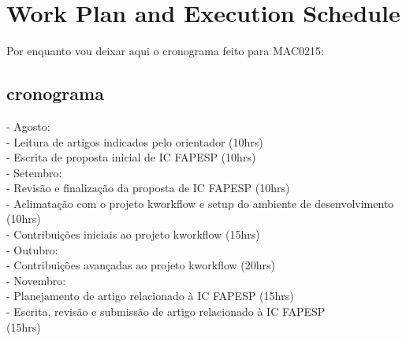 \section{Work Plan and Execution Schedule}
\label{chp:workplan-schedule}

Por enquanto vou deixar aqui o cronograma feito para MAC0215:
\subsection{cronograma}

- Agosto:\\
    - Leitura de artigos indicados pelo orientador (10hrs)\\
    - Escrita de proposta inicial de IC FAPESP (10hrs)\\
- Setembro:\\
    - Revisão e finalização da proposta de IC FAPESP (10hrs)\\
    - Aclimatação com o projeto kworkflow e setup do ambiente de desenvolvimento (10hrs)\\
    - Contribuições iniciais ao projeto kworkflow (15hrs)\\
- Outubro:\\
    - Contribuições avançadas ao projeto kworkflow (20hrs)\\
- Novembro:\\
    - Planejamento de artigo relacionado à IC FAPESP (15hrs)\\
    - Escrita, revisão e submissão de artigo relacionado à IC FAPESP \\(15hrs)
